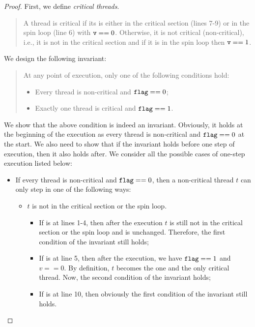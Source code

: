 \documentclass{article}[10pt]
\begin{document}
\begin{proof}
  First, we define \emph{critical threads}. 
  \begin{quote}
    A thread is critical if its  is either in the critical
    section (lines 7-9) or in the spin loop (line 6) with $\text{\ttfamily v} ==
    0$. Otherwise, it is not critical (non-critical), i.e., it is not in the critical
    section and if it is in the spin loop then $\text{\ttfamily v} == 1$.
  \end{quote}
  We design the following invariant:
  \begin{quote}
    At any point of execution, only one of the following conditions hold:
    \begin{itemize}
    \item Every thread is non-critical and $\text{\ttfamily flag} == 0$;
    \item Exactly one thread is critical and $\text{\ttfamily flag} == 1$.
    \end{itemize}
  \end{quote}
  We show that the above condition is indeed an
  invariant. Obviously, it holds at the beginning of the execution as
  every thread is non-critical and $\text{\ttfamily flag} == 0$ at the start. We also
  need to show that if the invariant holds before one step of
  execution, then it also holds after. We consider all the possible cases
  of one-step execution listed below:
  \begin{itemize}
  \item If every thread is non-critical and $\text{\ttfamily flag} == 0$, then a
    non-critical thread $t$ can only step in one of the following ways:
    \begin{itemize}
    \item $t$ is not in the critical section or the spin loop. 

      \begin{itemize}
      \item If  is at lines 1-4, then after the execution $t$
        is still not in the critical section or the spin loop and
        \kflag is unchanged. Therefore, the first condition of the
        invariant still holds;

      \item If  is at line 5, then after the execution, we
        have $\text{\ttfamily flag} == 1$ and $v == 0$. By definition, $t$ becomes
        the one and the only critical thread. Now, the second
        condition of the invariant holds;

      \item If  is at line 10, then obviously the first
        condition of the invariant still holds.


\end{itemize}
\end{itemize}
\end{itemize}
\end{proof}
\end{document}
